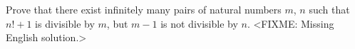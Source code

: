 \problem
Prove that there exist infinitely many pairs of natural numbers $m$, $n$ such
that $n! + 1$ is divisible by $m$, but $m - 1$ is not divisible by $n$.
\solution
<FIXME: Missing English solution.>
\endproblem
